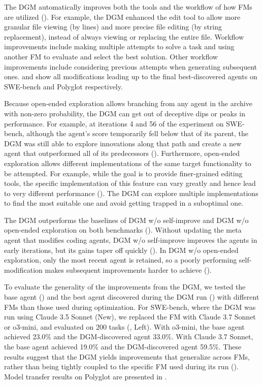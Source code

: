 The DGM automatically improves both the tools and the workflow of how FMs are utilized (). For example, the DGM enhanced the edit tool to allow more granular file viewing (by lines) and more precise file editing (by string replacement), instead of always viewing or replacing the entire file. Workflow improvements include making multiple attempts to solve a task and using another FM to evaluate and select the best solution. Other workflow improvements include considering previous attempts when generating subsequent ones.  and  show all modifications leading up to the final best-discovered agents on SWE-bench and Polyglot respectively.

Because open-ended exploration allows branching from any agent in the archive with non-zero probability, the DGM can get out of deceptive dips or peaks in performance. For example, at iterations 4 and 56 of the experiment on SWE-bench, although the agent's score temporarily fell below that of its parent, the DGM was still able to explore innovations along that path and create a new agent that outperformed all of its predecessors (). Furthermore, open-ended exploration allows different implementations of the same target functionality to be attempted. For example, while the goal is to provide finer‑grained editing tools, the specific implementation of this feature can vary greatly and hence lead to very different performance (). The DGM can explore multiple implementations to find the most suitable one and avoid getting trapped in a suboptimal one.

The DGM outperforms the baselines of DGM w/o self-improve and DGM w/o open-ended exploration on both benchmarks (). Without updating the meta agent that modifies coding agents, DGM w/o self-improve improves the agents in early iterations, but its gains taper off quickly (). In DGM w/o open-ended exploration, only the most recent agent is retained, so a poorly performing self-modification makes subsequent improvements harder to achieve ().



To evaluate the generality of the improvements from the DGM, we tested the base agent () and the best agent discovered during the DGM run () with different FMs than those used during optimization. For SWE-bench, where the DGM was run using Claude 3.5 Sonnet (New), we replaced the FM with Claude 3.7 Sonnet~\citep{anthropic2025claude37} or o3-mini, and evaluated on 200 tasks (, Left). With o3-mini, the base agent achieved 23.0\% and the DGM-discovered agent 33.0\%. With Claude 3.7 Sonnet, the base agent achieved 19.0\% and the DGM-discovered agent 59.5\%. These results suggest that the DGM yields improvements that generalize across FMs, rather than being tightly coupled to the specific FM used during its run (). Model transfer results on Polyglot are presented in .


